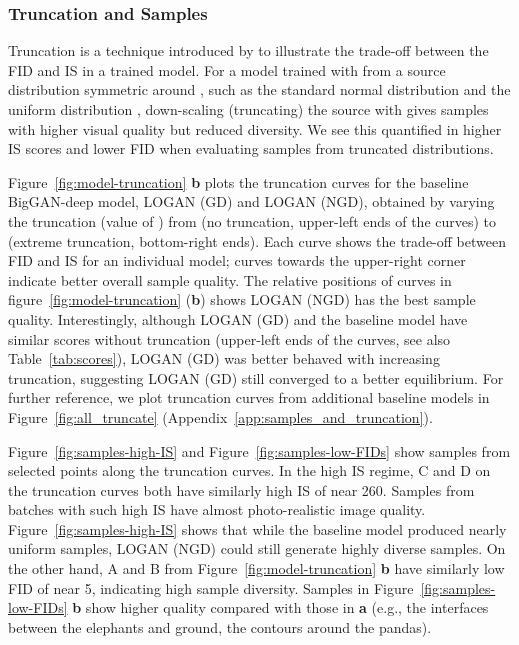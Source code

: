 \documentclass{article} \usepackage{iclr2020_conference,times}
\begin{document}
\subsubsection{Truncation and Samples}

Truncation is a technique introduced by \cite{brock2018large} to illustrate the trade-off between the FID and IS in a trained model. For a model trained with  from a source distribution symmetric around , such as the standard normal distribution  and the uniform distribution , down-scaling (truncating) the source  with  gives samples with higher visual quality but reduced diversity. We see this quantified in higher IS scores and lower FID when evaluating samples from truncated distributions.

Figure~\ref{fig:model-truncation} \textbf{b} plots the truncation curves for the baseline BigGAN-deep model, LOGAN (GD) and LOGAN (NGD), obtained by varying the truncation (value of ) from  (no truncation, upper-left ends of the curves) to  (extreme truncation, bottom-right ends). Each curve shows the trade-off between FID and IS for an individual model; curves towards the upper-right corner indicate better overall sample quality. The relative positions of curves in figure~\ref{fig:model-truncation} (\textbf{b}) shows LOGAN (NGD) has the best sample quality. Interestingly, although LOGAN (GD) and the baseline model have similar scores without truncation (upper-left ends of the curves, see also Table~\ref{tab:scores}), LOGAN (GD) was better behaved with increasing truncation, suggesting LOGAN (GD) still converged to a better equilibrium. For further reference, we plot truncation curves from additional baseline models in Figure~\ref{fig:all_truncate} (Appendix~\ref{app:samples_and_truncation}).

Figure~\ref{fig:samples-high-IS} and Figure~\ref{fig:samples-low-FIDs} show samples from selected points along the truncation curves. 
In the high IS regime, C and D on the truncation curves both have similarly high IS of near 260. Samples from batches with such high IS have almost photo-realistic image quality. Figure~\ref{fig:samples-high-IS} shows that while the baseline model produced nearly uniform samples, LOGAN (NGD) could still generate highly diverse samples.
On the other hand, A and B from Figure~\ref{fig:model-truncation} \textbf{b} have similarly low FID of near 5, indicating high sample diversity. Samples in Figure~\ref{fig:samples-low-FIDs} \textbf{b} show higher quality compared with those in \textbf{a} (e.g., the interfaces between the elephants and ground, the contours around the pandas).
\end{document}

